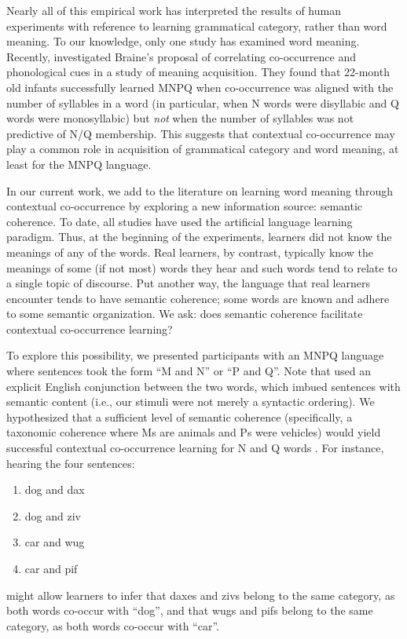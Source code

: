 \documentclass[man,floatsintext]{apa6}
\begin{document}
Nearly all of this empirical work has interpreted the results of human experiments with reference to learning grammatical category, rather than word meaning. To our knowledge, only one study has examined word meaning. Recently, \citet{lany2010} investigated Braine's proposal of correlating co-occurrence and phonological cues in a study of meaning acquisition. They found that 22-month old infants successfully learned MNPQ when co-occurrence was aligned with the number of syllables in a word (in particular, when N words were disyllabic and Q words were monosyllabic) but \emph{not} when the number of syllables was not predictive of N/Q membership. This suggests that contextual co-occurrence may play a common role in acquisition of grammatical category and word meaning, at least for the MNPQ language. 

In our current work, we add to the literature on learning word meaning through contextual co-occurrence by exploring a new information source: semantic coherence. To date, all studies have used the artificial language learning paradigm. Thus, at the beginning of the experiments, learners did not know the meanings of any of the words. Real learners, by contrast, typically know the meanings of some (if not most) words they hear and such words tend to relate to a single topic of discourse. Put another way, the language that real learners encounter tends to have semantic coherence; some words are known and adhere to some semantic organization. We ask: does semantic coherence facilitate contextual co-occurrence learning?

To explore this possibility, we presented participants with an MNPQ language where sentences took the form ``M and N'' or ``P and Q''. Note that used an explicit English conjunction between the two words, which imbued sentences with semantic content (i.e., our stimuli were not merely a syntactic ordering). We hypothesized that a sufficient level of semantic coherence (specifically, a taxonomic coherence where Ms are animals and Ps were vehicles) would yield successful contextual co-occurrence learning for N and Q words . For instance, hearing the four sentences:
\begin{enumerate}
\item dog and dax
\item dog and ziv
\item car and wug
\item car and pif
\end{enumerate} might allow learners to infer that daxes and zivs belong to the same category, as both words co-occur with ``dog'', and that wugs and pifs belong to the same category, as both words co-occur with ``car''.
\end{document}
